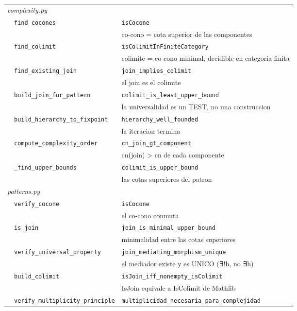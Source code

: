 \documentclass[11pt,a4paper]{article}
\begin{document}
\begin{longtable}{@{}p{1.2cm}p{5.9cm}p{7.2cm}@{}}
\midrule \multicolumn{3}{l}{\textit{complexity.py}} \\
  & \texttt{find\_cocones} & \texttt{isCocone} \\
  &  & \footnotesize co-cono = cota superior de las componentes \\
  & \texttt{find\_colimit} & \texttt{isColimitInFiniteCategory} \\
  &  & \footnotesize colimite = co-cono minimal, decidible en categoria finita \\
  & \texttt{find\_existing\_join} & \texttt{join\_implies\_colimit} \\
  &  & \footnotesize el join es el colimite \\
  & \texttt{build\_join\_for\_pattern} & \texttt{colimit\_is\_least\_upper\_bound} \\
  &  & \footnotesize la universalidad es un TEST, no una construccion \\
  & \texttt{build\_hierarchy\_to\_fixpoint} & \texttt{hierarchy\_well\_founded} \\
  &  & \footnotesize la iteracion termina \\
  & \texttt{compute\_complexity\_order} & \texttt{cn\_join\_gt\_component} \\
  &  & \footnotesize cn(join) > cn de cada componente \\
  & \texttt{\_find\_upper\_bounds} & \texttt{colimit\_is\_upper\_bound} \\
  &  & \footnotesize las cotas superiores del patron \\
\midrule \multicolumn{3}{l}{\textit{patterns.py}} \\
  & \texttt{verify\_cocone} & \texttt{isCocone} \\
  &  & \footnotesize el co-cono conmuta \\
  & \texttt{is\_join} & \texttt{join\_is\_minimal\_upper\_bound} \\
  &  & \footnotesize minimalidad entre las cotas superiores \\
  & \texttt{verify\_universal\_property} & \texttt{join\_mediating\_morphism\_unique} \\
  &  & \footnotesize el mediador existe y es UNICO (∃!h, no ∃h) \\
  & \texttt{build\_colimit} & \texttt{isJoin\_iff\_nonempty\_isColimit} \\
  &  & \footnotesize IsJoin equivale a IsColimit de Mathlib \\
  & \texttt{verify\_multiplicity\_principle} & \texttt{multiplicidad\_necesaria\_para\_complejidad} \\

\end{longtable}
\end{document}
